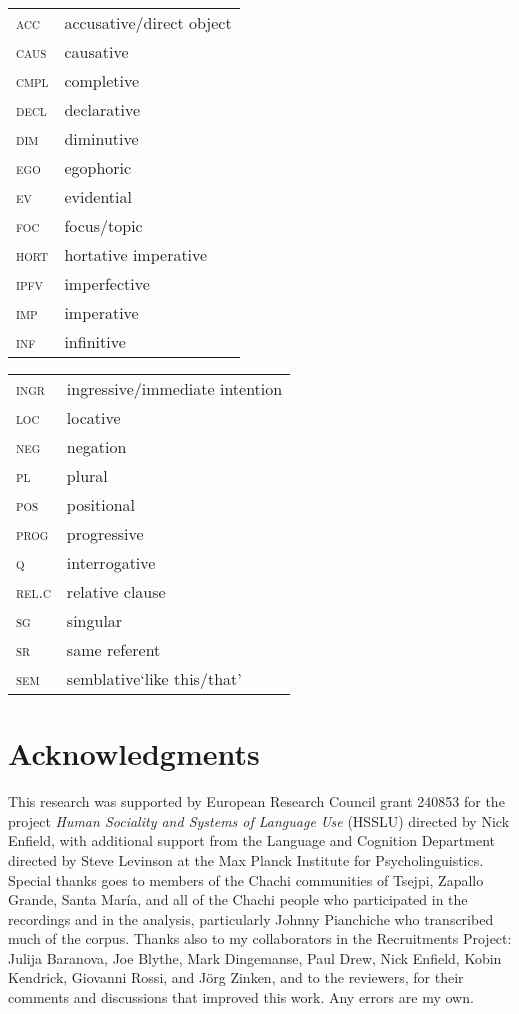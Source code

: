 \documentclass[output=paper]{langsci/langscibook}
\begin{document}
\begin{tabularx}{.43\textwidth}{>{\scshape}lQ}
acc & accusative/direct object\\
caus & causative\\
cmpl & completive\\
decl & declarative\\
dim & diminutive\\
ego & egophoric\\
ev & evidential\\
foc & focus/topic\\
hort & hortative imperative\\
ipfv & imperfective\\
imp & imperative\\
inf & infinitive
\end{tabularx}
\begin{tabularx}{.55\textwidth}{>{\scshape}lQ}
ingr & ingressive/immediate intention\\
loc & locative\\
neg & negation\\
pl & plural\\
pos & positional\\
prog & progressive\\
q & interrogative\\
rel.c & relative clause\\
sg & singular\\
sr & same referent\\
sem & semblative\newline  ‘like this/that'
\end{tabularx}

\section*{Acknowledgments}

This research was supported by European Research Council grant 240853 for the project \textit{Human Sociality and Systems of Language Use} (HSSLU) directed by Nick Enfield, with additional support from the Language and Cognition Department directed by Steve Levinson at the Max Planck Institute for Psycholinguistics. Special thanks goes to members of the Chachi communities of Tsejpi, Zapallo Grande, Santa María, and all of the Chachi people who participated in the recordings and in the analysis, particularly Johnny Pianchiche who transcribed much of the corpus. Thanks also to my collaborators in the Recruitments Project: Julija Baranova, Joe Blythe, Mark Dingemanse, Paul Drew, Nick Enfield, Kobin Kendrick, Giovanni Rossi, and Jörg Zinken, and to the reviewers, for their comments and discussions that improved this work. Any errors are my own. %

\sloppy
\printbibliography[heading=subbibliography,notkeyword=this]
\end{document}

